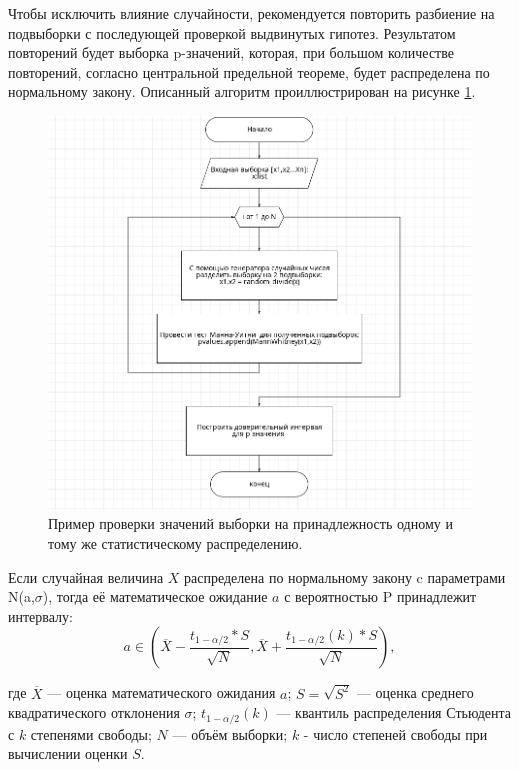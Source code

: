 Чтобы исключить влияние случайности, рекомендуется повторить разбиение на подвыборки с последующей проверкой выдвинутых гипотез. Результатом повторений будет выборка p-значений, которая, при большом количестве повторений, согласно центральной предельной теореме, будет распределена по нормальному закону. Описанный алгоритм проиллюстрирован на рисунке \ref{fig:ris13}.

\begin{figure}[H]
	\centering
	\includegraphics[width=1\linewidth]{pics/ris13} %
	\caption{Пример проверки значений выборки на принадлежность одному и тому же статистическому распределению.~\cite{RD}}
	\label{fig:ris13} %
\end{figure}

Если случайная величина $X$ распределена по нормальному закону c параметрами N(a,$\sigma$), тогда её математическое ожидание $a$ с вероятностью P принадлежит интервалу:
\begin{equation}
	a \in (\overline{X}-\frac{t_{1-\alpha/2}*S}{\sqrt{N}}, \overline{X}+\frac{t_{1-\alpha/2}(k)*S}{\sqrt{N}}), 
\end{equation}

где $\overline{X}$ --- оценка математического ожидания $a$; $S=\sqrt{S^2}$ --- оценка среднего квадратического отклонения $\sigma$; $t_{1-\alpha/2}(k)$ --- квантиль распределения Стьюдента с $k$ степенями свободы; $N$ --- объём выборки; $k$ - число степеней свободы при вычислении оценки $S$.

